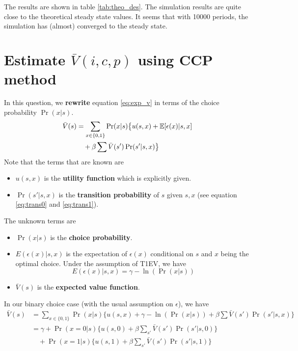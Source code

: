 \documentclass[12pt]{article}[margin=1in]
\begin{document}
The results are shown in table \ref{tab:theo_des}. The simulation results are quite close to the theoretical steady state values. It seems that with 10000 periods, the simulation has (almost) converged to the steady state.

\section{Estimate $\bar{V}(i,c,p)$ using CCP method}
In this question, we \textbf{rewrite} equation \ref{eq:exp_v} in terms of the choice probability $\Pr(x|s)$.
\begin{equation}
    \begin{split}
        \bar{V}(s) & =\sum_{x \in \{0,1\}} \Pr(x|s) \big\{ u(s,x) + \mathbb{E}[\epsilon(x)|s,x] \\
                   & \quad + \beta \sum \bar{V}(s') \Pr(s'|s,x) \big\}
    \end{split}
\end{equation}
Note that the terms that are known are
\begin{itemize}
    \item $u(s,x)$ is the \textbf{utility function} which is explicitly given.
    \item $\Pr(s'|s,x)$ is the \textbf{transition probability} of $s$ given $s,x$ (see equation \ref{eq:trans0} and \ref{eq:trans1}).
\end{itemize}
The unknown terms are
\begin{itemize}
    \item $\Pr(x|s)$ is the \textbf{choice probability}.
    \item $E(\epsilon(x)|s,x)$ is the expectation of $\epsilon(x)$ conditional on $s$ and $x$ being the optimal choice. Under the assumption of T1EV, we have
          \begin{equation*}
              E(\epsilon(x)|s,x)=\gamma-\ln(\Pr(x|s))
          \end{equation*}
    \item $\bar{V}(s)$ is the \textbf{expected value function}.
\end{itemize}
In our binary choice case (with the usual assumption on $\epsilon$), we have
\begin{equation}\label{eq:exp_v_bin_ccp}
    \begin{split}
        \bar{V}(s) & =\sum_{x \in \{0,1\}} \Pr(x|s) \big\{ u(s,x) + \gamma-\ln(\Pr(x|s)) +\beta \sum \bar{V}(s') \Pr(s'|s,x) \big\} \\
                   & =\gamma + \Pr(x=0|s) \{u(s,0) + \beta \sum_{s'} \bar{V}(s') \Pr(s'|s,0)\}                                      \\
                   & \quad + \Pr(x=1|s) \{u(s,1) + \beta \sum_{s'} \bar{V}(s') \Pr(s'|s,1)\}                                        \\
    \end{split}
\end{equation}
\end{document}
